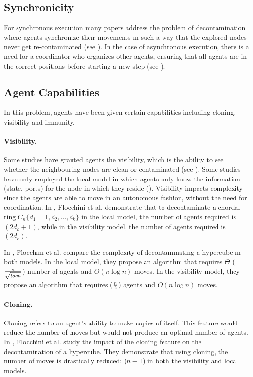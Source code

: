 \subsection{Synchronicity}
For synchronous execution many papers address the problem of decontamination where agents synchronize their movements in such a way that the explored nodes never get re-contaminated  (see \cite{lucetal22,floc21,baretal24}). In the case of asynchronous execution, there is a need for a coordinator who organizes other agents, ensuring that all agents are in the correct positions before starting a new step (see \cite{floetal13,lucetal22,floetal20,floetal19,floetal17}).


\subsection{Agent Capabilities}
In this problem, agents have been given certain capabilities including cloning, visibility and immunity.

\paragraph{ Visibility.}  Some studies have granted agents the visibility, which is the ability to see whether the neighbouring nodes are clean or contaminated (see \cite{floetal17,floetal20}). Some studies have only employed the local model in which agents only know the information (state, ports) for the node in which they reside (\cite{floetal19,floetal17,floetal20}). Visibility impacts complexity since the agents are able to move in an autonomous fashion, without the need for coordination. In \cite{floetal17}, Flocchini et al. demonstrate that to decontaminate a chordal ring $C_n\{d_1=1,d_2,...,d_k\}$ in the local model, the number of agents required is $(2d_k+1)$, while in the visibility model, the number of agents required is $(2  d_k)$.

 In \cite{floetal20}, Flocchini et al. compare the complexity of  decontaminating a hypercube in both models. In the local model, they propose an algorithm that requires  $\Theta$  ($n \over { \sqrt {log n}} $) number of agents and  $O(n \log n)$  moves. In the  visibility model, they propose an algorithm that requires ($n\over2$) agents and $O(n \log n)$ moves.



\paragraph{ Cloning.}
Cloning refers to an agent's ability to make copies of itself. This feature would reduce the number of moves but would not produce an optimal number of agents. In \cite{floetal20}, Flocchini et al. study the impact of the cloning feature on the decontamination of a hypercube. They demonstrate that using cloning, the number of moves is drastically reduced: ($n-1$) in both the visibility and local models.



